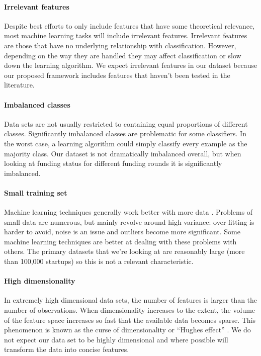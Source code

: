 \documentclass[../thesis/thesis.tex]{subfiles}
\begin{document}
\paragraph{Irrelevant features} Despite best efforts to only include features that have some theoretical relevance, most machine learning tasks will include irrelevant features. Irrelevant features are those that have no underlying relationship with classification. However, depending on the way they are handled they may affect classification or slow down the learning algorithm. We expect irrelevant features in our dataset because our proposed framework includes features that haven't been tested in the literature.

\paragraph{Imbalanced classes} Data sets are not usually restricted to containing equal proportions of different classes. Significantly imbalanced classes are problematic for some classifiers. In the worst case, a learning algorithm could simply classify every example as the majority class. Our dataset is not dramatically imbalanced overall, but when looking at funding status for different funding rounds it is significantly imbalanced.

\paragraph{Small training set} Machine learning techniques generally work better with more data \cite{caruana2008}. Problems of small-data are numerous, but mainly revolve around high variance: over-fitting is harder to avoid, noise is an issue and outliers become more significant. Some machine learning techniques are better at dealing with these problems with others. The primary datasets that we're looking at are reasonably large (more than 100,000 startups) so this is not a relevant characteristic.

\paragraph{High dimensionality} In extremely high dimensional data sets, the number of features is larger than the number of observations. When dimensionality increases to the extent, the volume of the feature space increases so fast that the available data becomes sparse. This phenomenon is known as the curse of dimensionality or ``Hughes effect'' \cite{hughes1968}. We do not expect our data set to be highly dimensional and where possible will transform the data into concise features.
\end{document}
